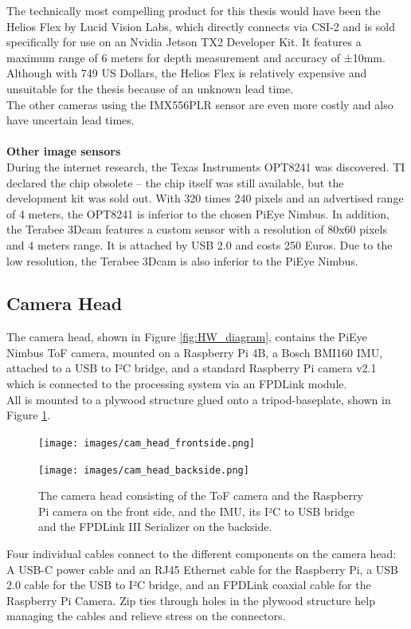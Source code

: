 The technically most compelling product for this thesis would have been the Helios Flex by Lucid Vision Labs, which directly connects via CSI-2 and is sold specifically for use on an Nvidia Jetson TX2 Developer Kit. It features a maximum range of 6 meters for depth measurement and accuracy of ±10mm. Although with 749 US Dollars, the Helios Flex is relatively expensive and unsuitable for the thesis because of an unknown lead time.\\
The other cameras using the IMX556PLR sensor are even more costly and also have uncertain lead times.\\
\\
\textbf{Other image sensors}\\
During the internet research, the Texas Instruments OPT8241 was discovered. TI declared the chip obsolete – the chip itself was still available, but the development kit was sold out. With 320 times 240 pixels and an advertised range of 4 meters, the OPT8241 is inferior to the chosen PiEye Nimbus. In addition, the Terabee 3Dcam features a custom sensor with a resolution of 80x60 pixels and 4 meters range. It is attached by USB 2.0 and costs 250 Euros. Due to the low resolution, the Terabee 3Dcam is also inferior to the PiEye Nimbus. 

\subsection{Camera Head}
\label{sec:camHead}
The camera head, shown in Figure \ref{fig:HW_diagram}, contains the PiEye Nimbus ToF camera, mounted on a Raspberry Pi 4B, a Bosch BMI160 IMU, attached to a USB to I²C bridge, and a standard Raspberry Pi camera v2.1 which is connected to the processing system via an FPDLink module.\\
All is mounted to a plywood structure glued onto a tripod-baseplate, shown in Figure \ref{fig:cameraHead}. 
\begin{figure}[H]
    \centering
    \begin{minipage}[b]{0.45\textwidth}
      \texttt{[image: images/cam\_head\_frontside.png]}
      \label{fig:cameraHeadfront} 
    \end{minipage} %
    \begin{minipage}[b]{0.45\textwidth}
      \texttt{[image: images/cam\_head\_backside.png]} 
      \label{fig:cameraHeadback} 
    \end{minipage}
    \caption{The camera head consisting of the ToF camera and the Raspberry Pi camera on the front side, and the IMU, its I²C to USB bridge and the FPDLink III Serializer on the backside.}
    \label{fig:cameraHead}
  \end{figure}
Four individual cables connect to the different components on the camera head: A USB-C power cable and an RJ45 Ethernet cable for the Raspberry Pi, a USB 2.0 cable for the USB to I²C bridge, and an FPDLink coaxial cable for the Raspberry Pi Camera. Zip ties through holes in the plywood structure help managing the cables and relieve stress on the connectors.
